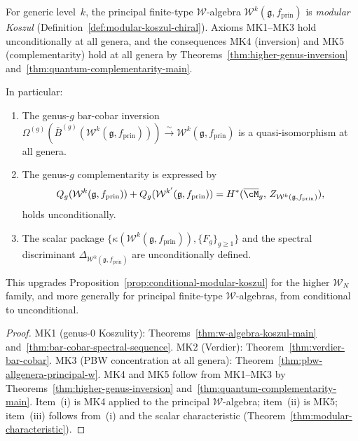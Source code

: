\begin{corollary}
\label{cor:unconditional-allgenera-principal-w}
For generic level~$k$, the principal finite-type
$\mathcal{W}$-algebra
$\mathcal{W}^k(\mathfrak{g}, f_{\mathrm{prin}})$ is
\emph{modular Koszul}
\textup{(}Definition~\textup{\ref{def:modular-koszul-chiral})}.
Axioms \textup{MK1--MK3} hold unconditionally at all genera, and the
consequences \textup{MK4} \textup{(}inversion\textup{)}
and \textup{MK5} \textup{(}complementarity\textup{)} hold
at all genera by
Theorems~\textup{\ref{thm:higher-genus-inversion}}
and~\textup{\ref{thm:quantum-complementarity-main}}.

In particular:
\begin{enumerate}[label=\textup{(\roman*)}]
\item The genus-$g$ bar-cobar inversion
$\Omega^{(g)}(\bar{B}^{(g)}(\mathcal{W}^k(\mathfrak{g}, f_{\mathrm{prin}})))
\xrightarrow{\sim} \mathcal{W}^k(\mathfrak{g}, f_{\mathrm{prin}})$
is a quasi-isomorphism at all genera.
\item The genus-$g$ complementarity
is expressed by
\[
Q_g(\mathcal{W}^k(\mathfrak{g}, f_{\mathrm{prin}}))
+ Q_g(\mathcal{W}^{k'}(\mathfrak{g}, f_{\mathrm{prin}}))
= H^*(\overline{\cM}_g,\, Z_{\mathcal{W}^k(\mathfrak{g}, f_{\mathrm{prin}})}),
\]
holds unconditionally.
\item The scalar package
$\{\kappa(\mathcal{W}^k(\mathfrak{g}, f_{\mathrm{prin}})),
\{F_g\}_{g \geq 1}\}$ and the spectral discriminant
$\Delta_{\mathcal{W}^k(\mathfrak{g}, f_{\mathrm{prin}})}$
are unconditionally defined.
\end{enumerate}
This upgrades
Proposition~\textup{\ref{prop:conditional-modular-koszul}}
for the higher $\mathcal{W}_N$ family, and more generally for
principal finite-type $\mathcal{W}$-algebras,
from conditional to unconditional.
\end{corollary}

\begin{proof}
MK1 (genus-$0$ Koszulity):
Theorems~\ref{thm:w-algebra-koszul-main}
and~\ref{thm:bar-cobar-spectral-sequence}.
MK2 (Verdier):
Theorem~\ref{thm:verdier-bar-cobar}.
MK3 (PBW concentration at all genera):
Theorem~\ref{thm:pbw-allgenera-principal-w}.
MK4 and MK5 follow from MK1--MK3 by
Theorems~\ref{thm:higher-genus-inversion}
and~\ref{thm:quantum-complementarity-main}.
Item~(i) is MK4 applied to the principal
$\mathcal{W}$-algebra;
item~(ii) is MK5;
item~(iii) follows from~(i) and the
scalar characteristic
(Theorem~\ref{thm:modular-characteristic}).
\end{proof}

